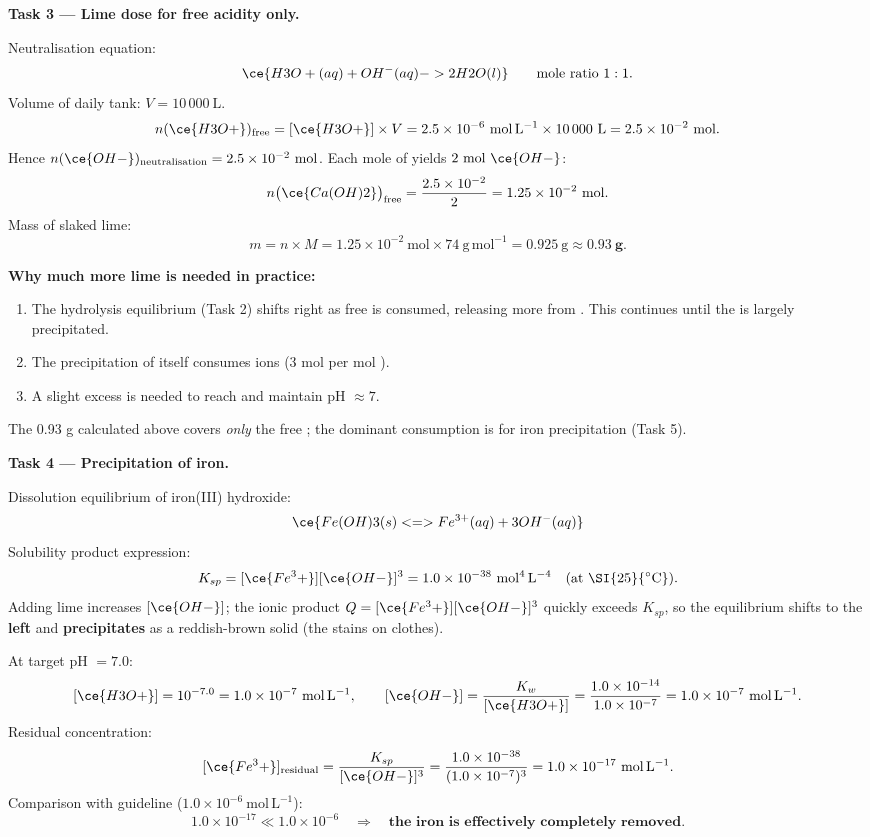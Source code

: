 \documentclass[11pt]{article}
\begin{document}
\textbf{Task 3 — Lime dose for free acidity only.}

Neutralisation equation:
\[
\ce{H3O+(aq) + OH^{-}(aq) -> 2H2O(l)} \qquad \text{mole ratio } 1:1.
\]
Volume of daily tank: $V = 10\,000\ \mathrm{L}$.
\[
n(\ce{H3O+})_{\text{free}} = [\ce{H3O+}] \times V = 2.5\times10^{-6}\ \mathrm{mol\,L^{-1}} \times 10\,000\ \mathrm{L} = 2.5\times10^{-2}\ \mathrm{mol}.
\]
Hence $n(\ce{OH-})_{\text{neutralisation}} = 2.5\times10^{-2}\ \mathrm{mol}$.
Each mole of  yields $2\ \mathrm{mol}\ \ce{OH-}$:
\[
n\big(\ce{Ca(OH)2}\big)_{\text{free}} = \frac{2.5\times10^{-2}}{2} = 1.25\times10^{-2}\ \mathrm{mol}.
\]
Mass of slaked lime:
\[
m = n \times M = 1.25\times10^{-2}\ \mathrm{mol} \times 74\ \mathrm{g\,mol^{-1}} = 0.925\ \mathrm{g} \approx \mathbf{0.93\ g}.
\]

\textbf{Why much more lime is needed in practice:}
\begin{enumerate}
\item The hydrolysis equilibrium (Task 2) shifts right as free  is consumed, releasing more  from . This continues until the  is largely precipitated.
\item The precipitation of  itself consumes  ions (3 mol  per mol ).
\item A slight excess is needed to reach and maintain pH $\approx 7$.
\end{enumerate}
The 0.93 g calculated above covers \emph{only} the free ; the dominant consumption is for iron precipitation (Task 5).

\textbf{Task 4 — Precipitation of iron.}

Dissolution equilibrium of iron(III) hydroxide:
\[
\ce{Fe(OH)3(s) <=> Fe^{3+}(aq) + 3OH^{-}(aq)}
\]
Solubility product expression:
\[
K_{sp} = [\ce{Fe^3+}][\ce{OH-}]^3 = 1.0\times10^{-38}\ \mathrm{mol^4\,L^{-4}} \quad (\text{at \SI{25}{\ensuremath{{}^{\circ}\mathrm{C}}}}).
\]
Adding lime increases $[\ce{OH-}]$; the ionic product $Q = [\ce{Fe^3+}][\ce{OH-}]^3$ quickly exceeds $K_{sp}$, so the equilibrium shifts to the \textbf{left} and \textbf{ precipitates} as a reddish-brown solid (the stains on clothes).

At target pH $= 7.0$:
\[
[\ce{H3O+}] = 10^{-7.0} = 1.0\times10^{-7}\ \mathrm{mol\,L^{-1}}, \qquad
[\ce{OH-}] = \frac{K_w}{[\ce{H3O+}]} = \frac{1.0\times10^{-14}}{1.0\times10^{-7}} = 1.0\times10^{-7}\ \mathrm{mol\,L^{-1}}.
\]
Residual  concentration:
\[
[\ce{Fe^3+}]_{\text{residual}} = \frac{K_{sp}}{[\ce{OH-}]^3}
= \frac{1.0\times10^{-38}}{(1.0\times10^{-7})^3}
= 1.0\times10^{-17}\ \mathrm{mol\,L^{-1}}.
\]
Comparison with guideline ($1.0\times10^{-6}\ \mathrm{mol\,L^{-1}}$):
\[
1.0\times10^{-17} \ll 1.0\times10^{-6} \quad \Rightarrow \quad \textbf{the iron is effectively completely removed.}
\]
\end{document}
